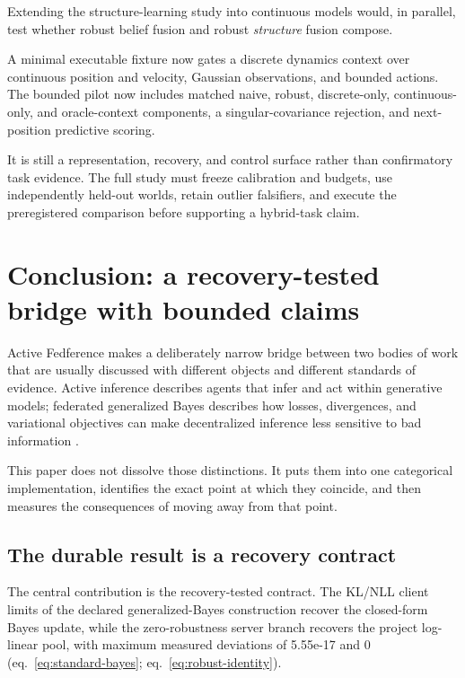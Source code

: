\documentclass[
  english,
]{article}
\theoremstyle{plain}
\theoremstyle{definition}
\theoremstyle{remark}
\theoremstyle{definition}
\begin{document}
Extending the structure-learning study
\citep{smith2020active, friston2011post} into continuous models would,
in parallel, test whether robust belief fusion and robust
\emph{structure} fusion compose.

A minimal executable fixture now gates a discrete dynamics context over
continuous position and velocity, Gaussian observations, and bounded
actions. The bounded pilot now includes matched naive, robust,
discrete-only, continuous-only, and oracle-context components, a
singular-covariance rejection, and next-position predictive scoring.

It is still a representation, recovery, and control surface rather than
confirmatory task evidence. The full study must freeze calibration and
budgets, use independently held-out worlds, retain outlier falsifiers,
and execute the preregistered comparison before supporting a hybrid-task
claim.

\section{Conclusion: a recovery-tested bridge with bounded
claims}\label{sec:conclusion}

Active Fedference makes a deliberately narrow bridge between two bodies
of work that are usually discussed with different objects and different
standards of evidence. Active inference describes agents that infer and
act within generative models; federated generalized Bayes describes how
losses, divergences, and variational objectives can make decentralized
inference less sensitive to bad information
\citep{friston2017active, dacosta2020active, bissiri2016general, knoblauch2022generalized}.

This paper does not dissolve those distinctions. It puts them into one
categorical implementation, identifies the exact point at which they
coincide, and then measures the consequences of moving away from that
point.

\subsection{The durable result is a recovery
contract}\label{sec:conclusion-recovery}

The central contribution is the recovery-tested contract. The KL/NLL
client limits of the declared generalized-Bayes construction recover the
closed-form Bayes update, while the zero-robustness server branch
recovers the project log-linear pool, with maximum measured deviations
of 5.55e-17 and 0 (eq.~\ref{eq:standard-bayes};
eq.~\ref{eq:robust-identity}).
\end{document}
